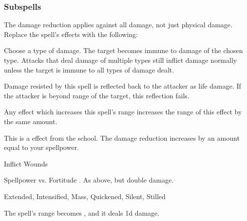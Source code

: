 \subsubsection{Subspells}
The damage reduction applies against all damage, not just physical damage.
Replace the spell's effects with the following:
\begin{spellcontent}
\begin{augmenteffects}
\spelleffect
Choose a type of damage.
The target becomes immune to damage of the chosen type.
Attacks that deal damage of multiple types still inflict damage normally unless the target is immune to all types of damage dealt.
\end{augmenteffects}
\end{spellcontent}
Damage resisted by this spell is reflected back to the attacker as life damage.
If the attacker is beyond \rngclose range of the target, this reflection fails.
\par Any effect which increases this spell's range increases the range of this effect by the same amount.
\par
This is a  effect from the  school.
The damage reduction increases by an amount equal to your spellpower.
\begin{spellsection}{Inflict Wounds}
\begin{spellcontent}
\begin{spelltargetinginfo}
\end{spelltargetinginfo}
\begin{spelleffects}
\begin{spellattack}{Spellpower vs. Fortitude}
\spellsuccess {}.
\spellcritical As above, but double damage.
\end{spellattack}
\end{spelleffects}
\end{spellcontent}
\begin{spellfooter}
 Extended, Intensified, Mass, Quickened, Silent, Stilled
\end{spellfooter}
\begin{spellsubcontent}
\begin{spellcantrip}
The spell's range becomes \rngclose, and it deals \minus1d damage.
\end{spellcantrip}
\end{spellsubcontent}
\end{spellsection}
